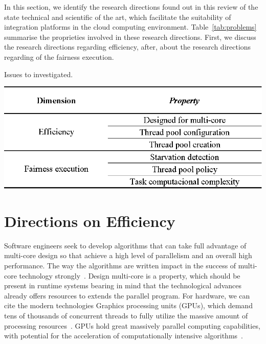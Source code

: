 \label{cap:researchproblems}
\noindent
In this section, we identify the research directions found out in this review of the state technical and scientific of the art, which facilitate the suitability of integration platforms in the cloud computing environment. Table~\ref{tab:problems} summarise the proprieties involved in these research directions. First, we discuss the research directions regarding efficiency, after, about the research directions regarding of the fairness execution.

\begin{table}[hbtp]
	\centering
	\caption{Issues to investigated.}
	\includegraphics[scale=0.9]{./figs/issues.eps}
\label{tab:problems}%
\end{table}%

\section{{Directions on Efficiency}}
\label{sec:directions_efficiency}
Software engineers seek to develop algorithms that can take full advantage of multi-core design so that achieve a high level of parallelism and an overall high performance. The way the algorithms are written impact in the success of multi-core technology strongly~\cite{sethi2015}. Design multi-core is a property, which should be present in runtime systems bearing in mind that the technological advances already offers resources to extends the parallel program. For hardware, we can cite the modern technologies Graphics processing units (GPUs), which demand tens of thousands of concurrent threads to fully utilize the massive amount of processing resources~\cite{yoon2016}. GPUs hold great massively parallel computing capabilities, with potential for the acceleration of computationally intensive algorithms~\cite{tang2017}. 

